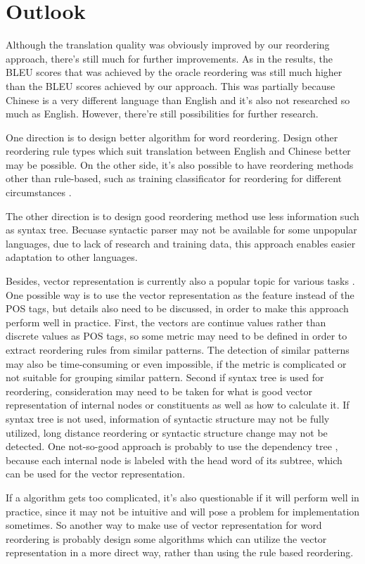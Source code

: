 \section{Outlook}
\label{ch:Discussion:sec:Outlook}

Although the translation quality was obviously improved by our reordering approach, there's still much for further improvements. As in the results, the BLEU scores that was achieved by the oracle reordering was still much higher than the BLEU scores achieved by our approach. This was partially because Chinese is a very different language than English and it's also not researched so much as English. However, there're still possibilities for further research.

One direction is to design better algorithm for word reordering. Design other reordering rule types which suit translation between English and Chinese better may be possible. On the other side, it's also possible to have reordering methods other than rule-based, such as training classificator for reordering for different circumstances \citep{google}.

The other direction is to design good reordering method use less information such as syntax tree. Becuase syntactic parser may not be available for some unpopular languages, due to lack of research and training data, this approach enables easier adaptation to other languages.

Besides, vector representation is currently also a popular topic for various tasks \citep{oxford, Mikolov}. One possible way is to use the vector representation as the feature instead of the POS tags, but details also need to be discussed, in order to make this approach perform well in practice. First, the vectors are continue values rather than discrete values as POS tags, so some metric may need to be defined in order to extract reordering rules from similar patterns. The detection of similar patterns may also be time-consuming or even impossible, if the metric is complicated or not suitable for grouping similar pattern. Second if syntax tree is used for reordering, consideration may need to be taken for what is good vector representation of internal nodes or constituents as well as how to calculate it. If syntax tree is not used, information of syntactic structure may not be fully utilized, long distance reordering or syntactic structure change may not be detected. One not-so-good approach is probably to use the dependency tree \citep{depend}, because each internal node is labeled with the head word of its subtree, which can be used for the vector representation. 

If a algorithm gets too complicated, it's also questionable if it will perform well in practice, since it may not be intuitive and will pose a problem for implementation sometimes. So another way to make use of vector representation for word reordering is probably design some algorithms which can utilize the vector representation in a more direct way, rather than using the rule based reordering.